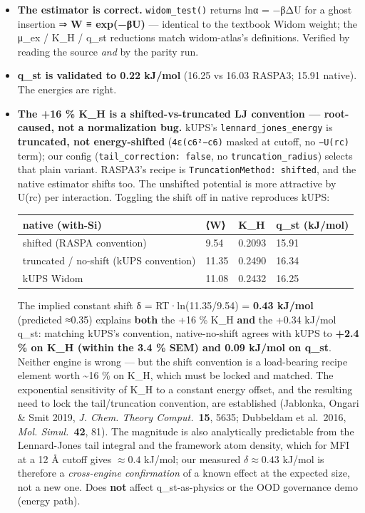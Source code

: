 \begin{itemize}
\item
  \textbf{The estimator is correct.} \texttt{widom\_test()} returns lnα
  = −βΔU for a ghost insertion ⇒ \textbf{W ≡ exp(−βU)} --- identical to
  the textbook Widom weight; the μ\_ex / K\_H / q\_st reductions match
  widom-atlas's definitions. Verified by reading the source \emph{and}
  by the parity run.
\item
  \textbf{q\_st is validated to 0.22 kJ/mol} (16.25 vs 16.03 RASPA3;
  15.91 native). The energies are right.
\item
  \textbf{The +16 \% K\_H is a shifted-vs-truncated LJ convention ---
  root-caused, not a normalization bug.} kUPS's
  \texttt{lennard\_jones\_energy} is \textbf{truncated, not
  energy-shifted} (\texttt{4ε(c6²−c6)} masked at cutoff, no
  \texttt{−U(rc)} term); our config (\texttt{tail\_correction:\ false},
  no \texttt{truncation\_radius}) selects that plain variant. RASPA3's
  recipe is \texttt{TruncationMethod:\ shifted}, and the native
  estimator shifts too. The unshifted potential is more attractive by
  U(rc) per interaction. Toggling the shift off in native reproduces
  kUPS:

  {%
  \begin{longtable}[]{@{}llll@{}}
  \toprule\noalign{}
  native (with-Si) & ⟨W⟩ & K\_H & q\_st (kJ/mol) \\
  \midrule\noalign{}
  \endhead
  \bottomrule\noalign{}
  \endlastfoot
  shifted (RASPA convention) & 9.54 & 0.2093 & 15.91 \\
  truncated / no-shift (kUPS convention) & 11.35 & 0.2490 & 16.34 \\
  kUPS Widom & 11.08 & 0.2432 & 16.25 \\
  \end{longtable}
  }

  The implied constant shift δ = RT·ln(11.35/9.54) = \textbf{0.43
  kJ/mol} (predicted ≈0.35) explains \textbf{both} the +16 \% K\_H
  \textbf{and} the +0.34 kJ/mol q\_st: matching kUPS's convention,
  native-no-shift agrees with kUPS to \textbf{+2.4 \% on K\_H (within
  the 3.4 \% SEM) and 0.09 kJ/mol on q\_st}. Neither engine is wrong ---
  but the shift convention is a load-bearing recipe element worth
  \textasciitilde16 \% on K\_H, which must be locked and matched. The
  exponential sensitivity of K\_H to a constant energy offset, and the
  resulting need to lock the tail/truncation convention, are established
  (Jablonka, Ongari \& Smit 2019, \emph{J. Chem. Theory Comput.}\ \textbf{15},
  5635; Dubbeldam et al.\ 2016, \emph{Mol. Simul.}\ \textbf{42}, 81). The
  magnitude is also analytically predictable from the Lennard-Jones tail
  integral and the framework atom density, which for MFI at a 12 Å cutoff
  gives \(\approx 0.4\) kJ/mol; our measured \(\delta \approx 0.43\) kJ/mol
  is therefore a \emph{cross-engine confirmation} of a known effect at the
  expected size, not a new one. Does
  \textbf{not} affect q\_st-as-physics or the OOD governance demo
  (energy path).
\end{itemize}

